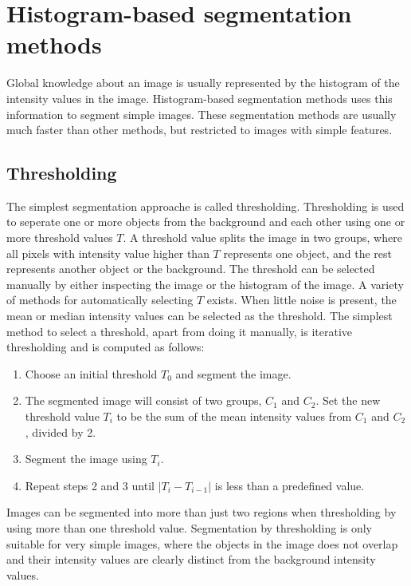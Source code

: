 \section{Histogram-based segmentation methods}
Global knowledge about an image is usually represented by the histogram of the intensity values in the image. Histogram-based segmentation methods uses this information to segment simple images. These segmentation methods are usually much faster than other methods, but restricted to images with simple features. 

\subsection{Thresholding}
The simplest segmentation approache is called thresholding. Thresholding is used to seperate one or more objects from the background and each other using one or more threshold values \(T\). A threshold value splits the image in two groups, where all pixels with intensity value higher than \(T\) represents one object, and the rest represents another object or the background. The threshold can be selected manually by either inspecting the image or the histogram of the image. A variety of methods for automatically selecting \(T\) exists. When little noise is present, the mean or median intensity values can be selected as the threshold. The simplest method to select a threshold, apart from doing it manually, is iterative thresholding and is computed as follows:
\begin{enumerate}
\item Choose an initial threshold \(T_{0}\) and segment the image.
\item The segmented image will consist of two groups, \(C_{1}\) and \(C_{2}\). Set the new threshold value \(T_{i}\) to be the sum of the mean intensity values from \(C_{1}\) and \(C_{2}\), divided by 2.
\item Segment the image using \(T_{i}\).
\item Repeat steps 2 and 3 until \(|T_{i} - T_{i-1}|\) is less than a predefined value.
\end{enumerate}
Images can be segmented into more than just two regions when thresholding by using more than one threshold value.
Segmentation by thresholding is only suitable for very simple images, where the objects in the image does not overlap and their intensity values are clearly distinct from the background intensity values.

